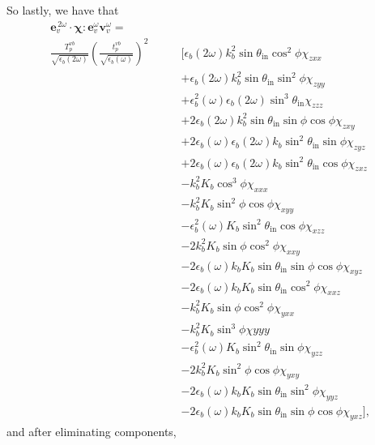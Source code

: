 So lastly, we have that
\begin{equation*}
\begin{split}
\mathbf{e}^{\,2\omega}_{v}\cdot
\boldsymbol{\chi}:\mathbf{e}^{\omega}_{v}\mathbf{v}^{\omega}_{v}
=\qquad\qquad&\\
\frac{T^{v b}_{p}}{\sqrt{\epsilon_{b}(2\omega)}}
\left(\frac{t^{v b}_{p}}{\sqrt{\epsilon_{b}(\omega)}}\right)^{2}
&\big[
    \epsilon_{b}(2\omega)k^{2}_{b}
    \sin\theta_{\mathrm{in}}\cos^{2}\phi\chi_{zxx}\\
&+  \epsilon_{b}(2\omega)k^{2}_{b}
    \sin\theta_{\mathrm{in}}\sin^{2}\phi\chi_{zyy}\\
&+  \epsilon^{2}_{b}(\omega)\epsilon_{b}(2\omega)
    \sin^{3}\theta_{\mathrm{in}}\chi_{zzz}\\
&+ 2\epsilon_{b}(2\omega)k^{2}_{b}\sin\theta_{\mathrm{in}}
    \sin\phi\cos\phi\chi_{zxy}\\
&+ 2\epsilon_{b}(\omega)\epsilon_{b}(2\omega)k_{b}
    \sin^{2}\theta_{\mathrm{in}}\sin\phi\chi_{zyz}\\
&+ 2\epsilon_{b}(\omega)\epsilon_{b}(2\omega)k_{b}
    \sin^{2}\theta_{\mathrm{in}}\cos\phi\chi_{zxz}\\
&-  k^{2}_{b}K_{b}\cos^{3}\phi\chi_{xxx}\\
&-  k^{2}_{b}K_{b}\sin^{2}\phi\cos\phi\chi_{xyy}\\
&-  \epsilon^{2}_{b}(\omega)K_{b}
    \sin^{2}\theta_{\mathrm{in}}\cos\phi\chi_{xzz}\\
&- 2k^{2}_{b}K_{b}\sin\phi\cos^{2}\phi\chi_{xxy}\\
&- 2\epsilon_{b}(\omega)k_{b}K_{b}
    \sin\theta_{\mathrm{in}}\sin\phi\cos\phi\chi_{xyz}\\
&- 2\epsilon_{b}(\omega)k_{b}K_{b}
    \sin\theta_{\mathrm{in}}\cos^{2}\phi\chi_{xxz}\\
&-  k^{2}_{b}K_{b}\sin\phi\cos^{2}\phi\chi_{yxx}\\
&-  k^{2}_{b}K_{b}\sin^{3}\phi\chi{yyy}\\
&-  \epsilon^{2}_{b}(\omega)K_{b}
    \sin^{2}\theta_{\mathrm{in}}\sin\phi\chi_{yzz}\\
&- 2k^{2}_{b}K_{b}\sin^{2}\phi\cos\phi\chi_{yxy}\\
&- 2\epsilon_{b}(\omega)k_{b}K_{b}
    \sin\theta_{\mathrm{in}}\sin^{2}\phi\chi_{yyz}\\
&- 2\epsilon_{b}(\omega)k_{b}K_{b}
    \sin\theta_{\mathrm{in}}\sin\phi\cos\phi\chi_{yxz}
\big],
\end{split}
\end{equation*}
and after eliminating components,
